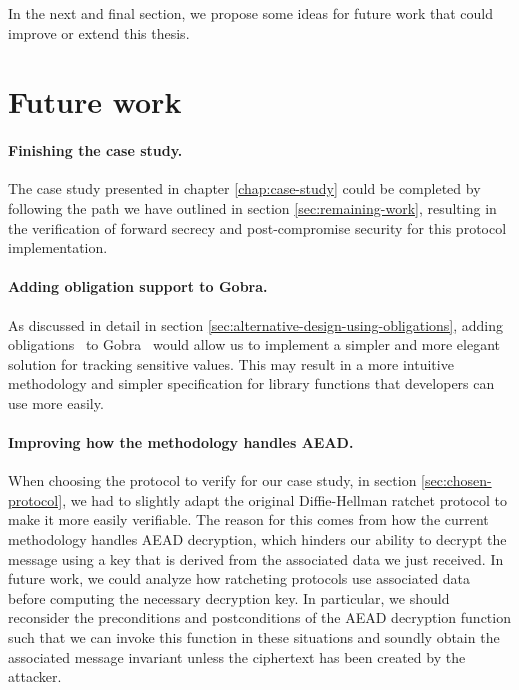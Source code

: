 In the next and final section, we propose some ideas for future work that could improve or extend this thesis.

\section{Future work}
\label{sec:future-work}

\paragraph{Finishing the case study.}
The case study presented in chapter \ref{chap:case-study} could be completed by following the path we have outlined in section \ref{sec:remaining-work}, resulting in the verification of forward secrecy and post-compromise security for this protocol implementation.

\paragraph{Adding obligation support to Gobra.}
As discussed in detail in section \ref{sec:alternative-design-using-obligations}, adding obligations~\cite{bostrom2014modular} to Gobra~\cite{wolf2021gobra} would allow us to implement a simpler and more elegant solution for tracking sensitive values.
This may result in a more intuitive methodology and simpler specification for library functions that developers can use more easily.

\paragraph{Improving how the methodology handles AEAD.}
When choosing the protocol to verify for our case study, in section \ref{sec:chosen-protocol}, we had to slightly adapt the original Diffie-Hellman ratchet protocol to make it more easily verifiable.
The reason for this comes from how the current methodology handles AEAD decryption, which hinders our ability to decrypt the message using a key that is derived from the associated data we just received.
In future work, we could analyze how ratcheting protocols use associated data before computing the necessary decryption key.
In particular, we should reconsider the preconditions and postconditions of the AEAD decryption function such that we can invoke this function in these situations and soundly obtain the associated message invariant unless the ciphertext has been created by the attacker.